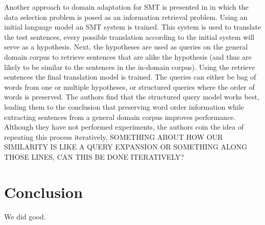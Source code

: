 \documentclass[11pt]{article}
\begin{document}
Another approach to domain adaptation for SMT is presented in \cite{query} in which the data selection problem is posed as an information retrieval problem. Using an initial language model an SMT system is trained. This system is used to translate the test sentences, every possible translation according to the initial system will serve as a hypothesis. Next, the hypotheses are used as queries on the general domain corpus to retrieve sentences that are alike the hypothesis (and thus are likely to be similar to the sentences in the in-domain corpus). Using the retrieve sentences the final translation model is trained. The queries can either be bag of words from one or multiple hypotheses, or structured queries where the order of words is preserved. The authors find that the structured query model works best, leading them to the conclusion that preserving word order information while extracting sentences from a general domain corpus improves performance. Although they have not performed experiments, the authors coin the idea of repeating this process iteratively. SOMETHING ABOUT HOW OUR SIMILARITY IS LIKE A QUERY EXPANSION OR SOMETHING ALONG THOSE LINES, CAN THIS BE DONE ITERATIVELY?


\section{Conclusion}
\label{sec:conclusion}
We did good.
\end{document}
